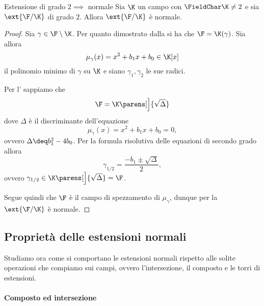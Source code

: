 \begin{proposition}
    {Estensione di grado $2 \implies$ normale}{}
    Sia $\K$ un campo con $\FieldChar \K \neq 2$ e sia $\ext{\F / \K}$ di grado $2$. Allora $\ext{\F / \K}$ è normale.   
\end{proposition}
\begin{proof}
    Sia $\gamma \in \F \setminus \K$. Per quanto dimostrato dalla  si ha che $\F = \K(\gamma)$. Sia allora \[
        \mu_\gamma(x) = x^2 + b_1x + b_0 \in \K[x]
    \]il polinomio minimo di $\gamma$ su $\K$ e siano $\gamma_1, \gamma_2$ le sue radici.
    
    Per l' sappiamo che \[
        \F = \K\parens[\Big]{\sqrt{\Delta}}
    \] dove $\Delta$ è il discriminante dell'equazione \[
        \mu_\gamma(x) = x^2 + b_1x + b_0 = 0, 
    \] ovvero $\Delta \deq b_1^2 - 4b_0$. Per la formula risolutiva delle equazioni di secondo grado allora \[
        \gamma_{1/2} = \frac{-b_1 \pm \sqrt{\Delta}}{2},
    \] ovvero $\gamma_{1/2} \in \K\parens[\Big]{\sqrt{\Delta}} = \F$.
    
    Segue quindi che $\F$ è il campo di spezzamento di $\mu_\gamma$, dunque per la  $\ext{\F / \K}$ è normale.  
\end{proof}

\subsection{Proprietà delle estensioni normali}

Studiamo ora come si comportano le estensioni normali rispetto alle solite operazioni che compiamo sui campi, ovvero l'intersezione, il composto e le torri di estensioni.

\paragraph{Composto ed intersezione}